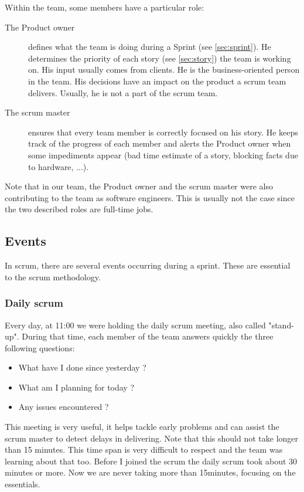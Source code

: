 Within the team, some members have a particular role:
\begin{description}
    \item[The Product owner]
        defines what the team is doing during a Sprint (see \ref{sec:sprint}).
        He determines the priority of each story (see \ref{sec:story}) the
        team is working on. His input usually comes from clients. He is the
        business-oriented person in the team. His decisions have an impact on
        the product a \gls{scrum} team delivers. Usually, he is not
        a part of the \gls{scrum} team.
    \item[The scrum master]
        ensures that every team member is correctly focused on his story. He
        keeps track of the progress of each member and alerts the
        Product owner when some impediments appear (bad time estimate of a
        story, blocking facts due to hardware, ...).
\end{description}

Note that in our team, the Product owner and the \gls{scrum} master were also contributing to the team as software engineers.
This is usually not the case since the two described roles are full-time jobs.

\subsection{Events}
In \gls{scrum}, there are several events occurring during a sprint.
These are essential to the \gls{scrum} methodology.

\subsubsection{Daily scrum}\label{sec:daily}
Every day, at 11:00 we were holding the daily \gls{scrum} meeting, also called "stand-up".
During that time, each member of the team answers quickly the three following questions:

\begin{itemize}
    \item What have I done since yesterday ?
    \item What am I planning for today ?
    \item Any issues encountered ?
\end{itemize}

This meeting is very useful, it helps tackle early problems and can assist the \gls{scrum} master to detect delays in delivering.
Note that this should not take longer than 15 minutes. This time span is very difficult to respect and the team was learning about that too.
Before I joined the scrum the daily \gls{scrum} took about 30 minutes or more. Now we are never taking more than 15minutes, focusing on the essentials.


